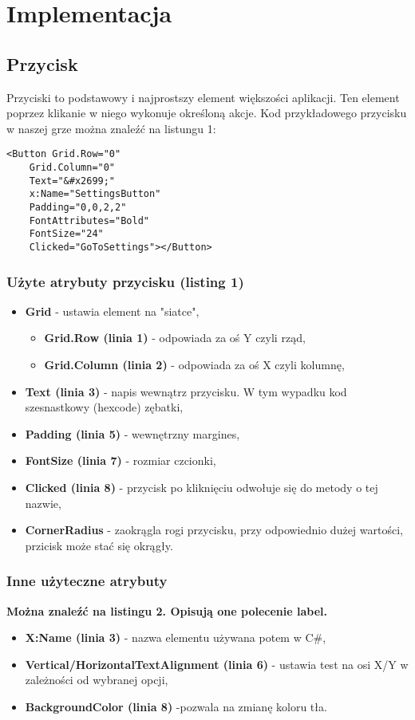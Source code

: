 	\newpage
\section{Implementacja}		%

\subsection{Przycisk}
Przyciski to podstawowy i najprostszy element większości aplikacji. Ten element poprzez klikanie w niego wykonuje określoną akcje. Kod przykładowego przycisku w naszej grze można znaleźć na listungu 1:

\begin{lstlisting}[caption=Button]
	<Button Grid.Row="0" 
	Grid.Column="0" 
	Text="&#x2699;" 
	x:Name="SettingsButton" 
	Padding="0,0,2,2" 
	FontAttributes="Bold"  
	FontSize="24" 
	Clicked="GoToSettings"></Button>
\end{lstlisting}

\subsubsection{Użyte atrybuty przycisku (listing 1)}
\begin{itemize}	
	\item \textbf{Grid }- ustawia element na "siatce",
	\begin{itemize}
	\item \textbf{Grid.Row (linia 1)  }- odpowiada za oś Y czyli rząd,
	\item \textbf{Grid.Column (linia 2) }- odpowiada za oś X czyli kolumnę,
	\end{itemize}
	\item \textbf{Text (linia 3) }- napis wewnątrz przycisku. W tym wypadku kod szesnastkowy (hexcode) zębatki,
	\item \textbf{Padding (linia 5) }- wewnętrzny margines,
	\item \textbf{FontSize (linia 7) }- rozmiar czcionki,
	\item \textbf{Clicked (linia 8)} - przycisk po kliknięciu odwołuje się do metody o tej nazwie,
	\item \textbf{CornerRadius} - zaokrągla rogi przycisku, przy odpowiednio dużej wartości, przicisk może stać się okrągły.

	
\end{itemize}
\subsubsection{Inne użyteczne atrybuty}
\textbf{Można znaleźć na listingu 2. Opisują one polecenie label.}
\begin{itemize}
	\item \textbf{X:Name (linia 3) }- nazwa elementu używana potem w C\#,
	\item \textbf{Vertical/HorizontalTextAlignment (linia 6)} - ustawia test na osi X/Y w zależności od wybranej opcji,
	\item \textbf{BackgroundColor (linia 8)} -pozwala na zmianę koloru tła.
\end{itemize}


